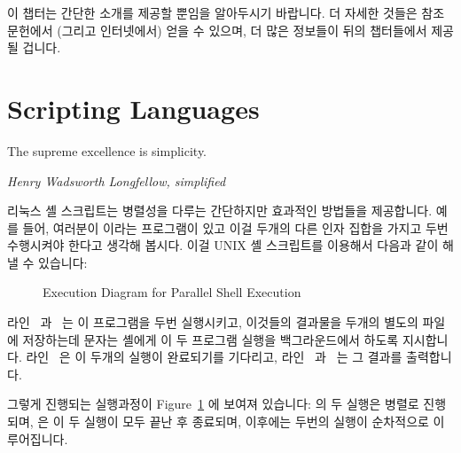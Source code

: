 이 챕터는 간단한 소개를 제공할 뿐임을 알아두시기 바랍니다.
더 자세한 것들은 참조문헌에서 (그리고 인터넷에서) 얻을 수 있으며, 더 많은
정보들이 뒤의 챕터들에서 제공될 겁니다.

\section{Scripting Languages}
\label{sec:toolsoftrade:Scripting Languages}
%
\epigraph{The supreme excellence is simplicity.}
	 {\emph{Henry Wadsworth Longfellow, simplified}}

리눅스 셸 스크립트는 병렬성을 다루는 간단하지만 효과적인 방법들을 제공합니다.
예를 들어, 여러분이  이라는 프로그램이 있고 이걸 두개의 다른
인자 집합을 가지고 두번 수행시켜야 한다고 생각해 봅시다.
이걸 UNIX 셸 스크립트를 이용해서 다음과 같이 해낼 수 있습니다:

\begin{figure}[tb]
\centering
{}
\caption{Execution Diagram for Parallel Shell Execution}
\label{fig:toolsoftrade:Execution Diagram for Parallel Shell Execution}
\end{figure}

\begin{fcvref}
라인~ 과~ 는 이 프로그램을 두번 실행시키고, 이것들의
결과물을 두개의 별도의 파일에 저장하는데 \co{&} 문자는 셸에게 이 두 프로그램
실행을 백그라운드에서 하도록 지시합니다.
라인~ 은 이 두개의 실행이 완료되기를 기다리고, 라인~
과~ 는 그 결과를 출력합니다.
\end{fcvref}
그렇게 진행되는 실행과정이
Figure~\ref{fig:toolsoftrade:Execution Diagram for Parallel Shell Execution}
에 보여져 있습니다:
 의 두 실행은 병렬로 진행되며,  은 이 두 실행이 모두
끝난 후 종료되며, 이후에는 두번의  실행이 순차적으로 이루어집니다.

